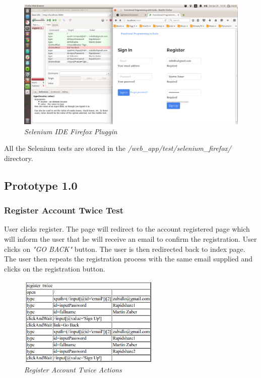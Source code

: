 \documentclass[12pt,twoside,a4paper]{report}
\begin{document}
\begin{figure}[!ht]
	\centering
		\includegraphics[width=1\textwidth, totalheight=9cm]
		{selenium_ide}
	\caption{\textit{Selenium IDE Firefox Pluggin}}
	\label{f5.3.1}
\end{figure}

All the Selenium tests are stored in the \emph{/web\_app/test/selenium\_firefox/} directory.

\subsection{Prototype 1.0}\label{5.3.1}
\subsubsection{Register Account Twice Test}\label{5.3.1.1}

User clicks register. The page will redirect to the account registered page which will inform the user that he will receive an email to confirm the registration. User clicks on \emph{"GO BACK"} button. The user is then redirected back to index page. The user then repeats the registration process with the same email supplied and clicks on the registration button.
\begin{figure}[!ht]
	\centering
		\includegraphics[width=0.6\textwidth, totalheight=5cm]
		{register_twice_test}
	\caption{\textit{Register Account Twice Actions}}
	\label{f5.3.1.1}
\end{figure}
\end{document}
